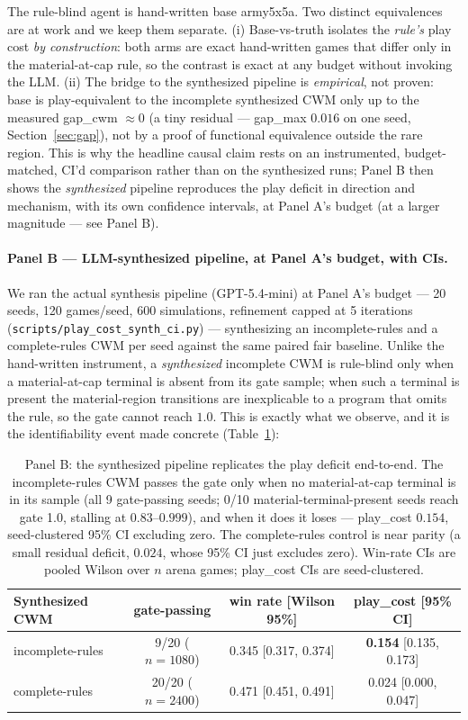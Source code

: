 \documentclass[11pt]{article}
\theoremstyle{remark}
\begin{document}
The rule-blind agent is hand-written base army5x5a. Two distinct equivalences are at work and we keep them separate. (i) Base-vs-truth isolates the \emph{rule's} play cost \emph{by construction}: both arms are exact hand-written games that differ only in the material-at-cap rule, so the contrast is exact at any budget without invoking the LLM. (ii) The bridge to the synthesized pipeline is \emph{empirical}, not proven: base is play-equivalent to the incomplete synthesized CWM only up to the measured gap\_cwm $\approx 0$ (a tiny residual --- gap\_max $0.016$ on one seed, Section~\ref{sec:gap}), not by a proof of functional equivalence outside the rare region. This is why the headline causal claim rests on an instrumented, budget-matched, CI'd comparison rather than on the synthesized runs; Panel B then shows the \emph{synthesized} pipeline reproduces the play deficit in direction and mechanism, with its own confidence intervals, at Panel A's budget (at a larger magnitude --- see Panel B).

\paragraph{Panel B --- LLM-synthesized pipeline, at Panel A's budget, with CIs.} We ran the actual synthesis pipeline (GPT-5.4-mini) at Panel A's budget --- 20 seeds, 120 games/seed, 600 simulations, refinement capped at 5 iterations (\texttt{scripts/play\_cost\_synth\_ci.py}) --- synthesizing an incomplete-rules and a complete-rules CWM per seed against the same paired fair baseline. Unlike the hand-written instrument, a \emph{synthesized} incomplete CWM is rule-blind only when a material-at-cap terminal is absent from its gate sample; when such a terminal is present the material-region transitions are inexplicable to a program that omits the rule, so the gate cannot reach $1.0$. This is exactly what we observe, and it is the identifiability event made concrete (Table~\ref{tab:panelB}):

\begin{table}[ht]
\centering
\small
\setlength{\tabcolsep}{5pt}
\begin{tabular}{lccc}
\toprule
Synthesized CWM & gate-passing & win rate [Wilson 95\%] & play\_cost [95\% CI] \\
\midrule
incomplete-rules & 9/20 ($n=1080$) & 0.345 [0.317, 0.374] & \textbf{0.154} [0.135, 0.173] \\
complete-rules   & 20/20 ($n=2400$) & 0.471 [0.451, 0.491] & 0.024 [0.000, 0.047] \\
\bottomrule
\end{tabular}
\caption{Panel B: the synthesized pipeline replicates the play deficit end-to-end. The incomplete-rules CWM passes the gate only when no material-at-cap terminal is in its sample (all 9 gate-passing seeds; 0/10 material-terminal-present seeds reach gate 1.0, stalling at $0.83$--$0.999$), and when it does it loses --- play\_cost $0.154$, seed-clustered 95\% CI excluding zero. The complete-rules control is near parity (a small residual deficit, $0.024$, whose 95\% CI just excludes zero). Win-rate CIs are pooled Wilson over $n$ arena games; play\_cost CIs are seed-clustered.}
\label{tab:panelB}
\end{table}
\end{document}

